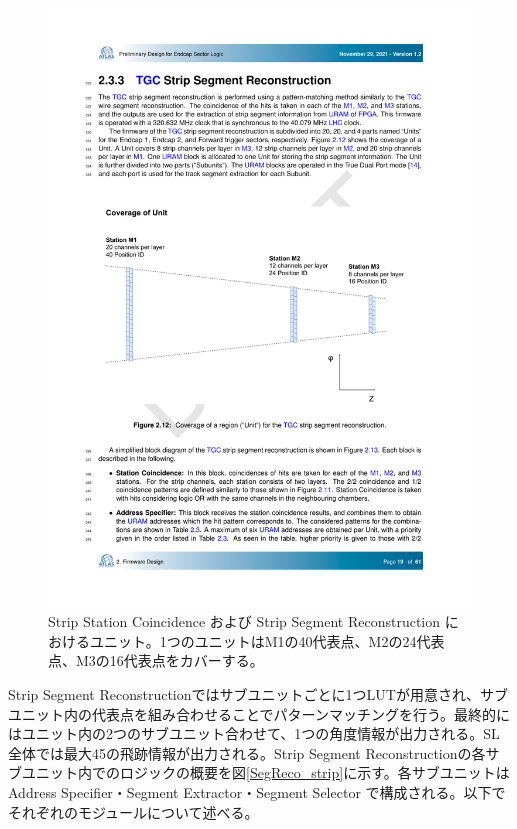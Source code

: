 \begin{figure} 
    \centering
    \includegraphics[width=12cm]{fig/SL/StationCoin_unit_strip.pdf}
    \caption[Strip Station Coincidence および Strip Segment Reconstruction におけるユニット]{Strip Station Coincidence および Strip Segment Reconstruction におけるユニット\cite{SLPDR}。1つのユニットはM1の40代表点、M2の24代表点、M3の16代表点をカバーする。}
    \label{StationCoin_unit_strip}
\end{figure}

Strip Segment Reconstructionではサブユニットごとに1つLUTが用意され、サブユニット内の代表点を組み合わせることでパターンマッチングを行う。最終的にはユニット内の2つのサブユニット合わせて、1つの角度情報が出力される。SL全体では最大45の飛跡情報が出力される。Strip Segment Reconstructionの各サブユニット内でのロジックの概要を図\ref{SegReco_strip}に示す。各サブユニットはAddress Specifier・Segment Extractor・Segment Selector で構成される。以下でそれぞれのモジュールについて述べる。

